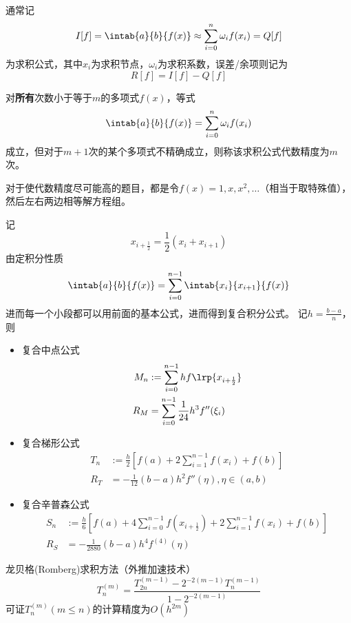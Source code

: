 通常记
\[I[f]=\intab{a}{b}{f(x)}\approx\sum_{i=0}^n\omega_i f(x_i)=Q[f]\]
为求积公式，其中$x_i$为求积节点，$\omega_i$为求积系数，误差/余项则记为
\[R[f]=I[f]-Q[f]\]
\begin{definition}[代数精度]
    对\textbf{所有}次数小于等于$m$的多项式$f(x)$，等式
    \[\intab{a}{b}{f(x)}=\sum_{i=0}^n\omega_i f(x_i)\]
    成立，但对于$m+1$次的某个多项式不精确成立，则称该求积公式代数精度为$m$次。
\end{definition}
对于使代数精度尽可能高的题目，都是令$f(x)=1,x,x^2,\ldots$（相当于取特殊值），然后左右两边相等解方程组。

记
\[x_{i+\frac{1}{2}}=\frac{1}{2}(x_i+x_{i+1})\]
由定积分性质
\[\intab{a}{b}{f(x)}=\sum_{i=0}^{n-1}\intab{x_i}{x_{i+1}}{f(x)}\]
进而每一个小段都可以用前面的基本公式，进而得到复合积分公式。
记$h=\frac{b-a}{n}$，则
\begin{itemize}
\item 复合中点公式
\[\begin{aligned}
    M_n&:=\sum_{i=0}^{n-1}hf\lrp{x_{i+\frac{1}{2}}}\\
    R_M&=\sum_{i=0}^{n-1}\frac{1}{24}h^3f''(\xi_i)
\end{aligned}\]
\item 复合梯形公式
\[\begin{aligned}
    T_n&:=\frac{h}{2}[f(a)+2\sum_{i=1}^{n-1}f(x_i)+f(b)]\\
    R_T&=-\frac{1}{12}(b-a)h^2f''(\eta),\eta\in(a,b)
\end{aligned}\]
\item 复合辛普森公式
\[\begin{aligned}
    S_n&:=\frac{h}{6}\left[f(a)+4\sum_{i=0}^{n-1}f(x_{i+\frac{1}{2}})+2\sum_{i=1}^{n-1}f(x_i)+f(b)\right]\\
    R_S&=-\frac{1}{2880}(b-a)h^4f^{(4)}(\eta)
\end{aligned}\]
\end{itemize}

龙贝格(Romberg)求积方法（外推加速技术）
\[T_n^{(m)}=\frac{T_{2n}^{(m-1)}-2^{-2(m-1)}T_n^{(m-1)}}{1-2^{-2(m-1)}}\]
可证$T_n^{(m)}(m\leq n)$的计算精度为$O(h^{2m})$

